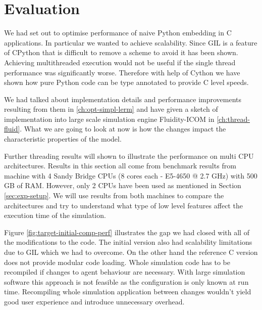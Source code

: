 \documentclass[12pt, a4paper]{report}
\begin{document}
\chapter{Evaluation}\label{ch:evaluation}

We had set out to optimise performance of naive Python embedding in C
applications. In particular we wanted to achieve scalability. Since
GIL is a feature of CPython that is difficult to remove a scheme
to avoid it has been shown. Achieving multithreaded execution would
not be useful if the single thread performance was significantly worse.
Therefore with help of Cython we have shown how pure Python code can
be type annotated to provide C level speeds.

We had talked about implementation details and performance
improvements resulting from them in \ref{ch:opt-simpl-lerm} and have
given a sketch of implementation into large scale simulation engine
Fluidity-ICOM in \ref{ch:thread-fluid}. What we are going to look
at now is how the changes impact the characteristic properties
of the model.

Further threading results will shown to illustrate the performance
on multi CPU architectures. Results in this section all come from
benchmark results from machine with 4 Sandy Bridge CPUs
(8 cores each - E5-4650 @ 2.7 GHz) with 500 GB of RAM. However,
only 2 CPUs have been used as mentioned in Section \ref{sec:exp-setup}.
We will use results from both machines to compare the architectures and
try to understand what type of low level features affect the execution
time of the simulation.

Figure \ref{fig:target-initial-comp-perf} illustrates the gap we had
closed with all of the modifications to the code. The initial version
also had scalability limitations due to GIL which we had to overcome.
On the other hand the reference C version does not provide modular
code loading. Whole simulation code has to be recompiled if changes
to agent behaviour are necessary. With large simulation software
this approach is not feasible as the configuration is only known at
run time. Recompiling whole simulation application between changes
wouldn't yield good user experience and introduce unnecessary overhead.
\end{document}
